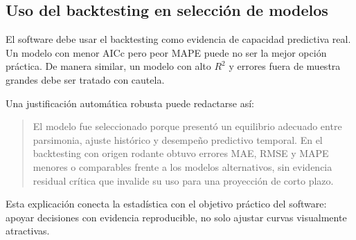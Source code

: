 \subsection{Uso del backtesting en selección de modelos}

El software debe usar el backtesting como evidencia de capacidad predictiva real. Un modelo con menor AICc pero peor MAPE puede no ser la mejor opción práctica. De manera similar, un modelo con alto \(R^2\) y errores fuera de muestra grandes debe ser tratado con cautela.

Una justificación automática robusta puede redactarse así:

\begin{quote}
El modelo fue seleccionado porque presentó un equilibrio adecuado entre parsimonia, ajuste histórico y desempeño predictivo temporal. En el backtesting con origen rodante obtuvo errores MAE, RMSE y MAPE menores o comparables frente a los modelos alternativos, sin evidencia residual crítica que invalide su uso para una proyección de corto plazo.
\end{quote}

Esta explicación conecta la estadística con el objetivo práctico del software: apoyar decisiones con evidencia reproducible, no solo ajustar curvas visualmente atractivas.
